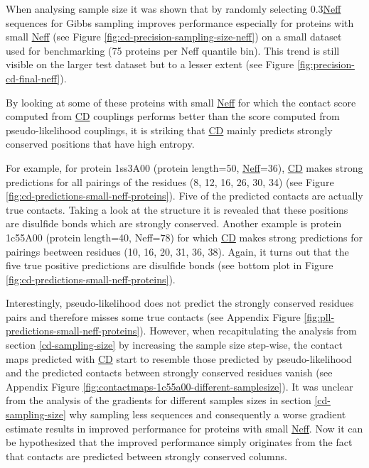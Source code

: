 \documentclass[11pt,a4paper,twoside]{book}
\theoremstyle{definition}
\theoremstyle{definition}
\theoremstyle{remark}
\begin{document}
When analysing sample size it was shown that by randomly selecting
0.3\protect\hyperlink{abbrev}{Neff} sequences for Gibbs sampling
improves performance especially for proteins with small
\protect\hyperlink{abbrev}{Neff} (see Figure
\ref{fig:cd-precision-sampling-size-neff}) on a small dataset used for
benchmarking (75 proteins per Neff quantile bin). This trend is still
visible on the larger test dataset but to a lesser extent (see Figure
\ref{fig:precision-cd-final-neff}).

By looking at some of these proteins with small
\protect\hyperlink{abbrev}{Neff} for which the contact score computed
from \protect\hyperlink{abbrev}{CD} couplings performs better than the
score computed from pseudo-likelihood couplings, it is striking that
\protect\hyperlink{abbrev}{CD} mainly predicts strongly conserved
positions that have high entropy.

For example, for protein 1ss3A00 (protein length=50,
\protect\hyperlink{abbrev}{Neff}=36), \protect\hyperlink{abbrev}{CD}
makes strong predictions for all pairings of the residues (8, 12, 16,
26, 30, 34) (see Figure \ref{fig:cd-predictions-small-neff-proteins}).
Five of the predicted contacts are actually true contacts. Taking a look
at the structure it is revealed that these positions are disulfide bonds
which are strongly conserved. Another example is protein 1c55A00
(protein length=40, Neff=78) for which \protect\hyperlink{abbrev}{CD}
makes strong predictions for pairings beetween residues (10, 16, 20, 31,
36, 38). Again, it turns out that the five true positive predictions are
disulfide bonds (see bottom plot in Figure
\ref{fig:cd-predictions-small-neff-proteins}).

Interestingly, pseudo-likelihood does not predict the strongly conserved
residues pairs and therefore misses some true contacts (see Appendix
Figure \ref{fig:pll-predictions-small-neff-proteins}). However, when
recapitulating the analysis from section \ref{cd-sampling-size} by
increasing the sample size step-wise, the contact maps predicted with
\protect\hyperlink{abbrev}{CD} start to resemble those predicted by
pseudo-likelihood and the predicted contacts between strongly conserved
residues vanish (see Appendix Figure
\ref{fig:contactmaps-1c55a00-different-samplesize}). It was unclear from
the analysis of the gradients for different samples sizes in section
\ref{cd-sampling-size} why sampling less sequences and consequently a
worse gradient estimate results in improved performance for proteins
with small \protect\hyperlink{abbrev}{Neff}. Now it can be hypothesized
that the improved performance simply originates from the fact that
contacts are predicted between strongly conserved columns.
\end{document}
